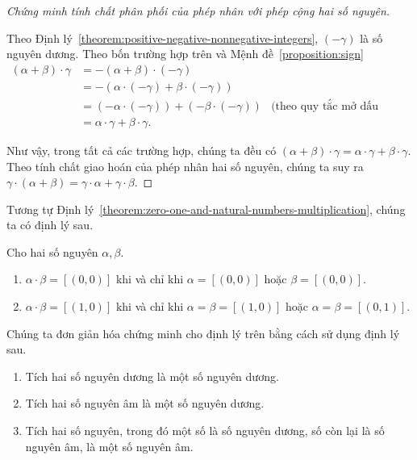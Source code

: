 \begin{proof}[Chứng minh tính chất phân phối của phép nhân với phép cộng hai số nguyên]
\begin{enumerate}[label={\textbf{Trường hợp \arabic*.}},itemindent=1.7cm]
		      Theo Định lý~\ref{theorem:positive-negative-nonnegative-integers}, $(-\gamma)$ là số nguyên dương. Theo bốn trường hợp trên và Mệnh đề~\ref{proposition:sign}
		      \begin{align*}
			      (\alpha + \beta)\cdot\gamma & = -(\alpha+\beta)\cdot(-\gamma)                                                         \\
			                                  & = -(\alpha\cdot(-\gamma) + \beta\cdot(-\gamma))                                         \\
			                                  & = (-\alpha\cdot(-\gamma)) + (-\beta\cdot(-\gamma)) & \text{(theo quy tắc mở dấu ngoặc)} \\
			                                  & = \alpha\cdot\gamma + \beta\cdot\gamma.
		      \end{align*}
	\end{enumerate}

	Như vậy, trong tất cả các trường hợp, chúng ta đều có $(\alpha + \beta)\cdot\gamma = \alpha\cdot\gamma + \beta\cdot\gamma$. Theo tính chất giao hoán của phép nhân hai số nguyên, chúng ta suy ra $\gamma\cdot(\alpha+\beta) = \gamma\cdot\alpha + \gamma\cdot\beta$.
\end{proof}

Tương tự Định lý~\ref{theorem:zero-one-and-natural-numbers-multiplication}, chúng ta có định lý sau.
\begin{theorem}\label{theorem:product-of-integers-are-zero-or-one}
	Cho hai số nguyên $\alpha, \beta$.
	\begin{enumerate}[label={(\roman*)}]
		\item $\alpha\cdot\beta = [(0,0)]$ khi và chỉ khi $\alpha = [(0,0)]$ hoặc $\beta = [(0,0)]$.
		\item $\alpha\cdot\beta = [(1,0)]$ khi và chỉ khi $\alpha = \beta = [(1, 0)]$ hoặc $\alpha = \beta = [(0,1)]$.
	\end{enumerate}
\end{theorem}

\noindent Chúng ta đơn giản hóa chứng minh cho định lý trên bằng cách sử dụng định lý sau.

\begin{theorem}\label{theorem:sign-of-product-of-integers}
	\begin{enumerate}[label={(\roman*)}]
		\item Tích hai số nguyên dương là một số nguyên dương.
		\item Tích hai số nguyên âm là một số nguyên dương.
		\item Tích hai số nguyên, trong đó một số là số nguyên dương, số còn lại là số nguyên âm, là một số nguyên âm.
	\end{enumerate}
\end{theorem}

